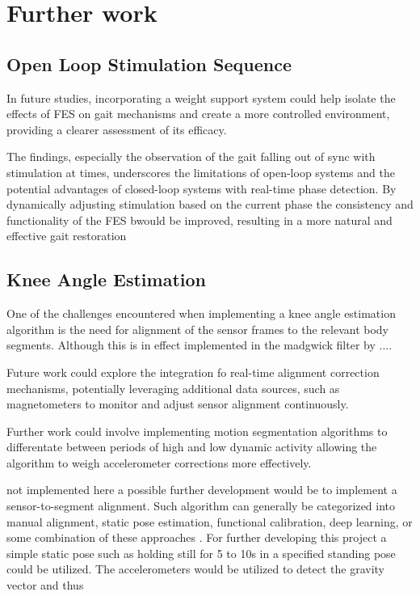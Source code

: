
\section{Further work}

\subsection{Open Loop Stimulation Sequence}

In future studies, incorporating a weight support system could help isolate the effects of FES on gait mechanisms and create a more controlled environment, providing a clearer assessment of its efficacy.

The findings, especially the observation of the gait falling out of sync with stimulation at times, underscores the limitations of open-loop systems and the potential advantages of closed-loop systems with real-time phase detection. By dynamically adjusting stimulation based on the current phase the consistency and functionality of the FES bwould be improved, resulting in a more natural and effective gait restoration

\subsection{Knee Angle Estimation}
One of the challenges encountered when implementing a knee angle estimation algorithm is the need for alignment of the sensor frames to the relevant body segments. Although this is in effect implemented in the madgwick filter by .... 


Future work could explore the integration fo real-time alignment correction mechanisms, potentially leveraging additional data sources, such as magnetometers to monitor and adjust sensor alignment continuously.

Further work could involve implementing motion segmentation algorithms to differentate between periods of high and low dynamic activity allowing the algorithm to weigh accelerometer corrections more effectively.

not implemented here a possible further development would be to implement a sensor-to-segment alignment. Such algorithm can generally be categorized into manual alignment, static pose estimation, functional calibration, deep learning, or some combination of these approaches \cite{rhudy_knee_2024}. For further developing this project a simple static pose such as holding still for 5 to 10s in a specified standing pose could be utilized. The accelerometers would be utilized to detect the gravity vector and thus 


